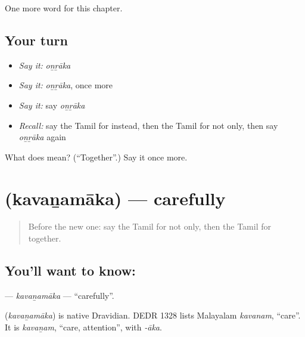\begin{grammarlens}[title={What you've built}]
One more word for this chapter.
\end{grammarlens}

\subsection*{Your turn}
\begin{itemize}
\raggedright
  \item \emph{Say it:} \emph{oṉṟāka}
  \item \emph{Say it:} \emph{oṉṟāka}, once more
  \item \emph{Say it:} say \emph{oṉṟāka}
  \item \emph{Recall:} say the Tamil for instead, then the Tamil for not only, then say \emph{oṉṟāka} again
\end{itemize}

\begin{tcolorbox}[breakable,colback=teal!4,colframe=teal!35!black,title={Before you move on}]
What does  mean? (\textquotedblleft{}Together\textquotedblright{}.) Say it once more.
\end{tcolorbox}
\section[\texorpdfstring{\ta{கவனமாக} (kavaṉamāka)}{கவனமாக (kavaṉamāka)}]{ (kavaṉamāka) — carefully}

\label{lesson:TA-C237-kavanamaka}



\begin{quote}
Before the new one: say the Tamil for not only, then the Tamil for together.
\end{quote}

\subsection*{You'll want to know: }
\textbf{} — \emph{kavaṉamāka} — \textquotedblleft{}carefully\textquotedblright{}.

\begin{cousinweb}
\textbf{} (\emph{kavaṉamāka}) is native Dravidian. DEDR 1328 lists Malayalam \emph{kavanam}, \textquotedblleft{}care\textquotedblright{}. It is \emph{kavaṉam}, \textquotedblleft{}care, attention\textquotedblright{}, with \emph{-āka}.
\end{cousinweb}

